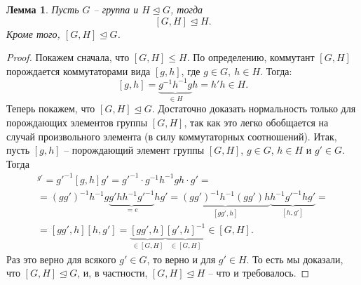 \documentclass{article}
\newtheorem{lemma}{Лемма}[section]
\begin{document}
\begin{lemma}
    Пусть $G$ -- группа и $H \trianglelefteq G$, тогда $$ [G, H] \trianglelefteq H. $$ Кроме того, $[G, H] \trianglelefteq G$.
\end{lemma}
\begin{proof}
    Покажем сначала, что $[G, H] \leqslant H$. По определению, коммутант $[G, H]$ порождается коммутаторами вида $[g, h]$, где $g \in G,\ h \in H$. Тогда:
    \[
        [g, h] = \underbrace{g^{-1} h^{-1} g}_{\in H} h = h' h \in H.
    \]
    Теперь покажем, что $[G, H] \trianglelefteq G$. Достаточно доказать нормальность только для порождающих элементов группы $[G, H]$, так как это легко обобщается на случай произвольного элемента (в силу коммутаторных соотношений). Итак, пусть $[g, h]$ -- порождающий элемент группы $[G, H]$, $g \in G$, $h \in H$ и $g' \in G$. Тогда
    \begin{multline*}
        [g, h]^{g'} = g'^{-1} [g, h] g' = g'^{-1} \cdot g^{-1} h^{-1} g h \cdot g' = \\
        = (g g')^{-1} h^{-1} g \underbrace{g' h h^{-1} g'^{-1}}_{=e} h g' = \underbrace{(g g')^{-1} h^{-1} (g g') h}_{[g g', h]} \underbrace{h^{-1} {g'}^{-1} h g'}_{[h, g']} = \\
        = [gg', h] [h, g'] = \underbrace{[gg', h]}_{\in [G, H]} \underbrace{[g', h]^{-1}}_{\in [G, H]} \in [G, H].
    \end{multline*}
    Раз это верно для всякого $g' \in G$, то верно и для $g' \in H$. То есть мы доказали, что $[G, H] \trianglelefteq G$, и, в частности, $[G, H] \trianglelefteq H$ -- что и требовалось.
\end{proof}
\end{document}
